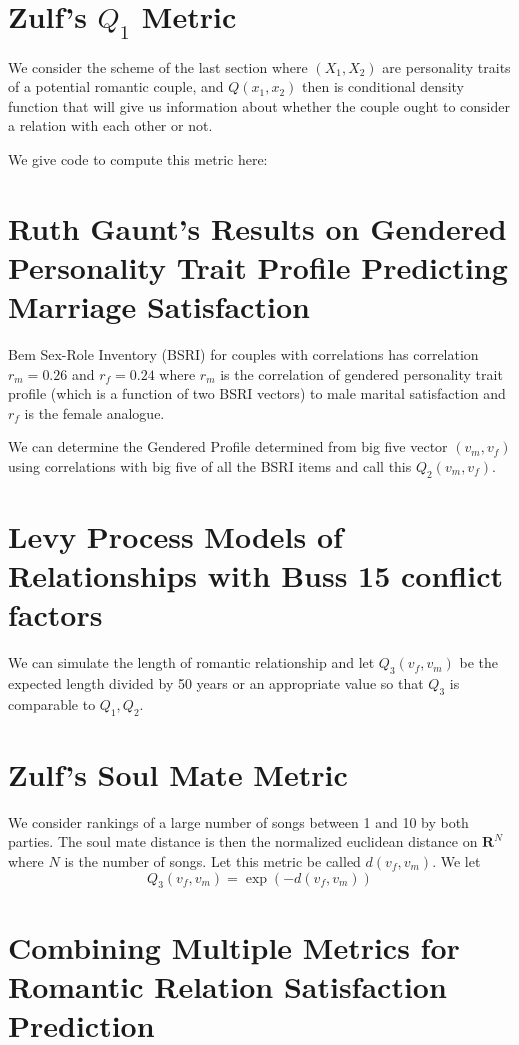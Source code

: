 \documentclass{article}
\begin{document}
\section{Zulf's $Q_1$ Metric}

We consider the scheme of the last section where $(X_1,X_2)$ are personality traits of a potential romantic couple, and $Q(x_1,x_2)$ then is conditional density function that will give us information about whether the couple ought to consider a relation with each other or not.

We give code to compute this metric here:

\section{Ruth Gaunt's Results on Gendered Personality Trait Profile Predicting Marriage Satisfaction}

Bem Sex-Role Inventory (BSRI) for couples with correlations has correlation $r_m = 0.26$ and $r_f=0.24$ where $r_m$ is the correlation of gendered personality trait profile (which is a function of two BSRI vectors) to male marital satisfaction and $r_f$ is the female analogue.

We can determine the Gendered Profile determined from big five vector $(v_m, v_f)$ using correlations with big five of all the BSRI items and call this $Q_2(v_m, v_f)$.  

\section{Levy Process Models of Relationships with Buss 15 conflict factors}

We can simulate the length of romantic relationship and let $Q_3(v_f, v_m)$ be the expected length divided by 50 years or an appropriate value so that $Q_3$ is comparable to $Q_1,Q_2$.

\section{Zulf's Soul Mate Metric}
We consider rankings of a large number of songs between 1 and 10 by both parties.  The soul mate distance is then the normalized euclidean distance on $\mathbf{R}^N$ where $N$ is the number of songs. Let this metric be called $d(v_f,v_m)$.  We let 
\[
Q_3(v_f,v_m) = \exp( - d(v_f,v_m))
\]

\section{Combining Multiple Metrics for Romantic Relation Satisfaction Prediction}
\end{document}
